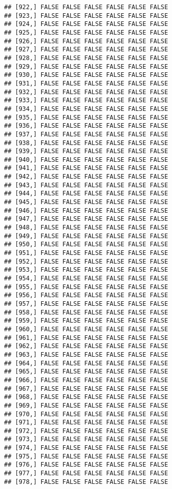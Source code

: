 \documentclass[
]{article}
\begin{document}
\begin{verbatim}
## [922,] FALSE FALSE FALSE FALSE FALSE FALSE
## [923,] FALSE FALSE FALSE FALSE FALSE FALSE
## [924,] FALSE FALSE FALSE FALSE FALSE FALSE
## [925,] FALSE FALSE FALSE FALSE FALSE FALSE
## [926,] FALSE FALSE FALSE FALSE FALSE FALSE
## [927,] FALSE FALSE FALSE FALSE FALSE FALSE
## [928,] FALSE FALSE FALSE FALSE FALSE FALSE
## [929,] FALSE FALSE FALSE FALSE FALSE FALSE
## [930,] FALSE FALSE FALSE FALSE FALSE FALSE
## [931,] FALSE FALSE FALSE FALSE FALSE FALSE
## [932,] FALSE FALSE FALSE FALSE FALSE FALSE
## [933,] FALSE FALSE FALSE FALSE FALSE FALSE
## [934,] FALSE FALSE FALSE FALSE FALSE FALSE
## [935,] FALSE FALSE FALSE FALSE FALSE FALSE
## [936,] FALSE FALSE FALSE FALSE FALSE FALSE
## [937,] FALSE FALSE FALSE FALSE FALSE FALSE
## [938,] FALSE FALSE FALSE FALSE FALSE FALSE
## [939,] FALSE FALSE FALSE FALSE FALSE FALSE
## [940,] FALSE FALSE FALSE FALSE FALSE FALSE
## [941,] FALSE FALSE FALSE FALSE FALSE FALSE
## [942,] FALSE FALSE FALSE FALSE FALSE FALSE
## [943,] FALSE FALSE FALSE FALSE FALSE FALSE
## [944,] FALSE FALSE FALSE FALSE FALSE FALSE
## [945,] FALSE FALSE FALSE FALSE FALSE FALSE
## [946,] FALSE FALSE FALSE FALSE FALSE FALSE
## [947,] FALSE FALSE FALSE FALSE FALSE FALSE
## [948,] FALSE FALSE FALSE FALSE FALSE FALSE
## [949,] FALSE FALSE FALSE FALSE FALSE FALSE
## [950,] FALSE FALSE FALSE FALSE FALSE FALSE
## [951,] FALSE FALSE FALSE FALSE FALSE FALSE
## [952,] FALSE FALSE FALSE FALSE FALSE FALSE
## [953,] FALSE FALSE FALSE FALSE FALSE FALSE
## [954,] FALSE FALSE FALSE FALSE FALSE FALSE
## [955,] FALSE FALSE FALSE FALSE FALSE FALSE
## [956,] FALSE FALSE FALSE FALSE FALSE FALSE
## [957,] FALSE FALSE FALSE FALSE FALSE FALSE
## [958,] FALSE FALSE FALSE FALSE FALSE FALSE
## [959,] FALSE FALSE FALSE FALSE FALSE FALSE
## [960,] FALSE FALSE FALSE FALSE FALSE FALSE
## [961,] FALSE FALSE FALSE FALSE FALSE FALSE
## [962,] FALSE FALSE FALSE FALSE FALSE FALSE
## [963,] FALSE FALSE FALSE FALSE FALSE FALSE
## [964,] FALSE FALSE FALSE FALSE FALSE FALSE
## [965,] FALSE FALSE FALSE FALSE FALSE FALSE
## [966,] FALSE FALSE FALSE FALSE FALSE FALSE
## [967,] FALSE FALSE FALSE FALSE FALSE FALSE
## [968,] FALSE FALSE FALSE FALSE FALSE FALSE
## [969,] FALSE FALSE FALSE FALSE FALSE FALSE
## [970,] FALSE FALSE FALSE FALSE FALSE FALSE
## [971,] FALSE FALSE FALSE FALSE FALSE FALSE
## [972,] FALSE FALSE FALSE FALSE FALSE FALSE
## [973,] FALSE FALSE FALSE FALSE FALSE FALSE
## [974,] FALSE FALSE FALSE FALSE FALSE FALSE
## [975,] FALSE FALSE FALSE FALSE FALSE FALSE
## [976,] FALSE FALSE FALSE FALSE FALSE FALSE
## [977,] FALSE FALSE FALSE FALSE FALSE FALSE
## [978,] FALSE FALSE FALSE FALSE FALSE FALSE

\end{verbatim}
\end{document}
